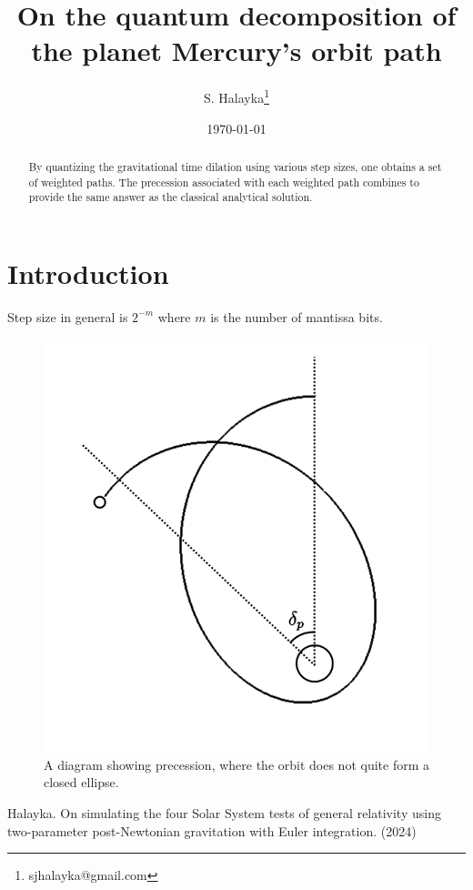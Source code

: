 \documentclass[12pt]{article}
\title{On the quantum decomposition of the planet Mercury's orbit path}
\author{S. Halayka\footnote{sjhalayka@gmail.com}}
\date{\today\;\currenttime}
\begin{document}
 
\maketitle

\begin{abstract}
By quantizing the gravitational time dilation using various step sizes, one obtains a set of weighted paths.
The precession associated with each weighted path combines to provide the same answer as the classical analytical solution.
\end{abstract}


\section{Introduction}


Step size in general is $2^{-m}$ where $m$ is the number of mantissa bits.




\begin{figure} 
\centering
\label{fig4}
  \includegraphics[width = 4 in]{precession.png}
  \caption{ A diagram showing precession, where the orbit does not quite form a closed ellipse.
}
\end{figure}



\begin{thebibliography}{9}


 Halayka. On simulating the four Solar System tests of general relativity using two-parameter post-Newtonian gravitation with Euler integration. (2024)

\end{thebibliography}
\end{document}

